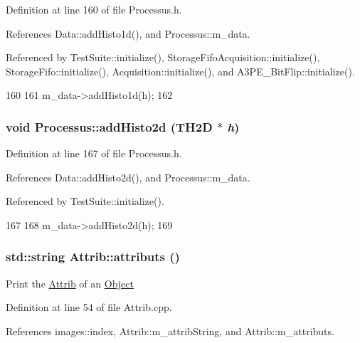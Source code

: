 Definition at line 160 of file Processus.h.

References Data::addHisto1d(), and Processus::m\_\-data.

Referenced by TestSuite::initialize(), StorageFifoAcquisition::initialize(), StorageFifo::initialize(), Acquisition::initialize(), and A3PE\_\-BitFlip::initialize().


\begin{DoxyCode}
160                            {
161     m_data->addHisto1d(h);
162   }
\end{DoxyCode}
\hypertarget{classProcessus_ac1ed1aed5edaeabdf18aa56775440471}{
\subsubsection[{addHisto2d}]{\setlength{\rightskip}{0pt plus 5cm}void Processus::addHisto2d (TH2D $\ast$ {\em h})}}
\label{classProcessus_ac1ed1aed5edaeabdf18aa56775440471}


Definition at line 167 of file Processus.h.

References Data::addHisto2d(), and Processus::m\_\-data.

Referenced by TestSuite::initialize().


\begin{DoxyCode}
167                            {
168     m_data->addHisto2d(h);
169   }
\end{DoxyCode}
\hypertarget{classAttrib_aee7bbf16b144887f196e1341b24f8a26}{
\subsubsection[{attributs}]{\setlength{\rightskip}{0pt plus 5cm}std::string Attrib::attributs ()}}
\label{classAttrib_aee7bbf16b144887f196e1341b24f8a26}
Print the \hyperlink{classAttrib}{Attrib} of an \hyperlink{classObject}{Object} 

Definition at line 54 of file Attrib.cpp.

References images::index, Attrib::m\_\-attribString, and Attrib::m\_\-attributs.

